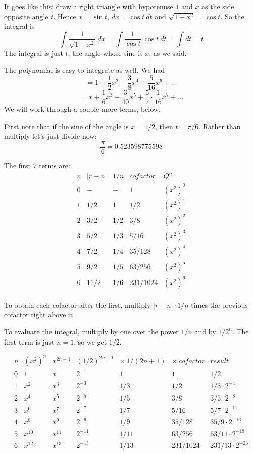 \documentclass[11pt, oneside]{article}
\begin{document}
It goes like this:  draw a right triangle with hypotenuse $1$ and $x$ as the side opposite angle $t$.  Hence $x = \sin t$, $dx = \cos t \ dt$ and $\sqrt{1-x^2} = \cos t$. So the integral is
\[ \int \frac{1}{\sqrt{1 - x^2}} \ dx = \int \frac{1}{\cos t} \ \cos t \ dt = \int dt = t \]
The integral is just $t$, the angle whose sine is $x$, as we said.

The polynomial is easy to integrate as well.  We had
\[ = 1 + \frac{1}{2}x^2 + \frac{3}{8} x^4 + \frac{5}{16} x^6 + \dots \]
\[ = x + \frac{1}{6}x^3 + \frac{3}{40} x^5 + \frac{5}{7} \cdot \frac{1}{16} x^7 + \dots \]
We will work through a couple more terms, below.

First note that if the sine of the angle is $x = 1/2$, then $t = \pi/6$.  Rather than multiply let's just divide now:
\[ \frac{\pi}{6} = 0.523598775598 \]

The first 7 terms are:
\[
\begin{matrix}
n & |r-n| & 1/n & cofactor & Q^n  \\
0  & - & - & 1 & (x^2)^0 \\
1 & 1/2 & 1 & 1/2 & (x^2)^1 \\
2 & 3/2 & 1/2 & 3/8 & (x^2)^2  \\
3 & 5/2 & 1/3 &  5/16 & (x^2)^3  \\
4 & 7/2 & 1/4 &  35/128 & (x^2)^4  \\
5 & 9/2  & 1/5 &  63/256  & (x^2)^5 \\
6 & 11/2  & 1/6 &  231/1024  & (x^2)^6  \\
\end{matrix}
\] 

To obtain each cofactor after the first, multiply $|r-n| \cdot 1/n$ times the previous cofactor right above it.

To evaluate the integral, multiply by one over the power $1/n$ and by $1/2^n$.  The first term is just $n=1$, so we get $1/2$.

\[
\begin{matrix}
n & (x^2)^n & x^{2n+1} & (1/2)^{2n+1} & \times \ 1/(2n+1) & \times \ cofactor & result  \\
0  & 1 & x  & 2^{-1} & 1 & 1 & 1/2 \\
1  & x^2 & x^3  & 2^{-3} & 1/3 & 1/2 & 1/3 \cdot 2^{-4} \\
2  & x^4 & x^5  & 2^{-5} & 1/5 & 3/8 &  3/5 \cdot 2^{-8}  \\
3  & x^6 & x^7  & 2^{-7} & 1/7 &  5/16 & 5/7 \cdot  2^{-11}  \\
4  & x^8 & x^9  & 2^{-9} & 1/9 &  35/128 & 35/9 \cdot 2^{-16}  \\
5  & x^{10} & x^{11}  & 2^{-11}  & 1/11 &  63/256  &  63/11 \cdot 2^{-19} \\
6  & x^{12} & x^{13}  & 2^{-13}  & 1/13 &  231/1024  &  231/13 \cdot 2^{-23}  \\
\end{matrix}
\] 
\end{document}
